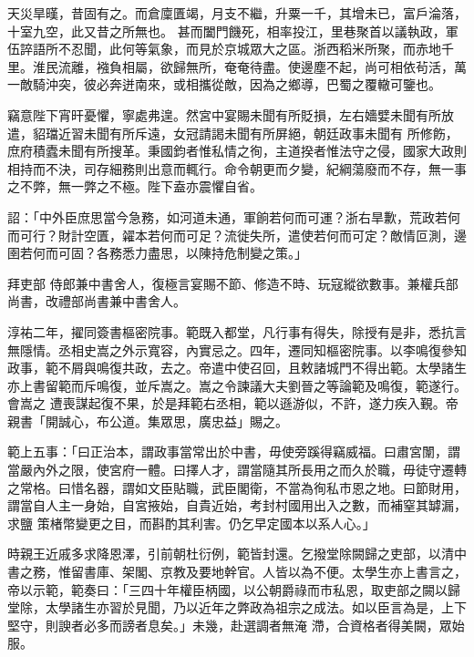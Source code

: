 \begin{pinyinscope}
 天災旱暵，昔固有之。而倉廩匱竭，月支不繼，升粟一千，其增未已，富戶淪落，十室九空，此又昔之所無也。
 甚而闔門饑死，相率投江，里巷聚首以議執政，軍伍誶語所不忍聞，此何等氣象，而見於京城眾大之區。浙西稻米所聚，而赤地千里。淮民流離，襁負相屬，欲歸無所，奄奄待盡。使邊塵不起，尚可相依茍活，萬一敵騎沖突，彼必奔迸南來，或相攜從敵，因為之鄉導，巴蜀之覆轍可鑒也。



 竊意陛下宵旰憂懼，寧處弗遑。然宮中宴賜未聞有所貶損，左右嬙嬖未聞有所放遣，貂璫近習未聞有所斥遠，女冠請謁未聞有所屏絕，朝廷政事未聞有
 所修飭，庶府積蠹未聞有所搜革。秉國鈞者惟私情之徇，主道揆者惟法守之侵，國家大政則相持而不決，司存細務則出意而輒行。命令朝更而夕變，紀綱蕩廢而不存，無一事之不弊，無一弊之不極。陛下盍亦震懼自省。



 詔：「中外臣庶思當今急務，如河道未通，軍餉若何而可運？浙右旱歉，荒政若何而可行？財計空匱，糴本若何而可足？流徙失所，遣使若何而可定？敵情叵測，邊圉若何而可固？各務悉力盡思，以陳持危制變之策。」



 拜吏部
 侍郎兼中書舍人，復極言宴賜不節、修造不時、玩寇縱欲數事。兼權兵部尚書，改禮部尚書兼中書舍人。



 淳祐二年，擢同簽書樞密院事。範既入都堂，凡行事有得失，除授有是非，悉抗言無隱情。丞相史嵩之外示寬容，內實忌之。四年，遷同知樞密院事。以李鳴復參知政事，範不屑與鳴復共政，去之。帝遣中使召回，且敕諸城門不得出範。太學諸生亦上書留範而斥鳴復，並斥嵩之。嵩之令諫議大夫劉晉之等論範及鳴復，範遂行。會嵩之
 遭喪謀起復不果，於是拜範右丞相，範以遜游似，不許，遂力疾入覲。帝親書「開誠心，布公道。集眾思，廣忠益」賜之。



 範上五事：「曰正治本，謂政事當常出於中書，毋使旁蹊得竊威福。曰肅宮闈，謂當嚴內外之限，使宮府一體。曰擇人才，謂當隨其所長用之而久於職，毋徒守遷轉之常格。曰惜名器，謂如文臣貼職，武臣閣衛，不當為徇私市恩之地。曰節財用，謂當自人主一身始，自宮掖始，自貴近始，考封村國用出入之數，而補窒其罅漏，求鹽
 策楮幣變更之目，而斟酌其利害。仍乞早定國本以系人心。」



 時親王近戚多求降恩澤，引前朝杜衍例，範皆封還。乞撥堂除闕歸之吏部，以清中書之務，惟留書庫、架閣、京教及要地幹官。人皆以為不便。太學生亦上書言之，帝以示範，範奏曰：「三四十年權臣柄國，以公朝爵祿而市私恩，取吏部之闕以歸堂除，太學諸生亦習於見聞，乃以近年之弊政為祖宗之成法。如以臣言為是，上下堅守，則諛者必多而謗者息矣。」未幾，赴選調者無淹
 滯，合資格者得美闕，眾始服。




\end{pinyinscope}

